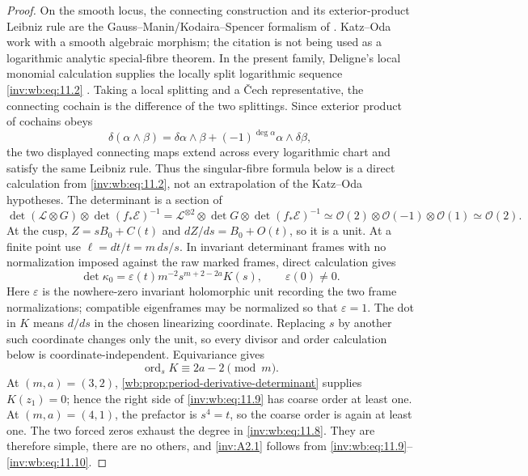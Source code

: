 \begin{proof}
On the smooth locus, the connecting construction and its
exterior-product Leibniz rule are the Gauss--Manin/Kodaira--Spencer
formalism of
\cite[\S2, equations~(5)--(10), pp.~202--204]{KatzOda1968}.
Katz--Oda work with a smooth algebraic morphism; the citation is not being
used as a logarithmic analytic special-fibre theorem.  In the present family,
Deligne's local monomial calculation supplies the locally split logarithmic
sequence \eqref{inv:wb:eq:11.2} \cite[Chapter~II, \S3.3]{Deligne1970}.  Taking a local
splitting and a \v Cech representative, the connecting cochain is the
difference of the two splittings.  Since exterior product of cochains obeys
\[
 \delta(\alpha\wedge\beta)
 =\delta\alpha\wedge\beta+(-1)^{\deg\alpha}
   \alpha\wedge\delta\beta,
\]
the two displayed connecting maps extend across every logarithmic chart and
satisfy the same Leibniz rule.  Thus the singular-fibre formula below is a
direct calculation from \eqref{inv:wb:eq:11.2}, not an extrapolation of the Katz--Oda
hypotheses.
The determinant is a section of
\[
 \det(\mathcal L\otimes G)\otimes\det(f_*\mathcal E)^{-1}
 =\mathcal L^{\otimes2}\otimes\det G
   \otimes\det(f_*\mathcal E)^{-1}
 \simeq\mathcal O(2)\otimes\mathcal O(-1)\otimes\mathcal O(1)
 \simeq\mathcal O(2).
\tag{WBH.11.8}\label{inv:wb:eq:11.8}
\]
At the cusp, $Z=sB_0+C(t)$ and $dZ/ds=B_0+O(t)$, so it is a unit.  At a
finite point use $\ell=dt/t=m\,ds/s$.  In invariant determinant frames
with no normalization imposed against the raw marked frames, direct
calculation gives
\[
 \det\kappa_0
 =\varepsilon(t)m^{-2}s^{m+2-2a}K(s),
 \qquad \varepsilon(0)\ne0.
\tag{WBH.11.9}\label{inv:wb:eq:11.9}
\]
Here $\varepsilon$ is the nowhere-zero invariant holomorphic unit recording the two
frame normalizations; compatible eigenframes may be normalized so that
$\varepsilon=1$.  The dot in $K$ means $d/ds$ in the chosen linearizing coordinate.
Replacing $s$ by another such coordinate changes only the unit, so every
divisor and order calculation below is coordinate-independent.
Equivariance gives
\[
 \operatorname{ord}_sK\equiv2a-2\pmod m.
\tag{WBH.11.10}\label{inv:wb:eq:11.10}
\]
At $(m,a)=(3,2)$, 
\cref{wb:prop:period-derivative-determinant} supplies $K(z_1)=0$; hence the
right side of \eqref{inv:wb:eq:11.9} has coarse order at least one.  At $(m,a)=(4,1)$,
the prefactor is $s^4=t$, so the coarse order is again at least one.
The two forced zeros exhaust the degree in \eqref{inv:wb:eq:11.8}.  They are therefore
simple, there are no others, and \cref{inv:A2.1} follows from \eqref{inv:wb:eq:11.9}--\eqref{inv:wb:eq:11.10}.


\end{proof}
